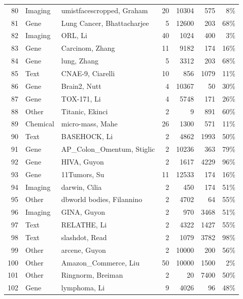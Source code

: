 \documentclass[preprint,12pt,authoryear]{elsarticle}
\begin{document}
{\begin{longtable}{@{}r p{1.9cm} p{6.7cm} r r r r@{}}
80 & Imaging & umistfacescropped, Graham \citeyearpar{graham1998characterising} & 20 & 10304 & 575 & 8\% \\
81 & Gene & Lung Cancer, Bhattacharjee \citeyearpar{bhattacharjee2001classification} & 5 & 12600 & 203 & 68\% \\
82 & Imaging & ORL, Li \citeyearpar{li2017feature} & 40 & 1024 & 400 & 3\% \\
83 & Gene & Carcinom, Zhang \citeyearpar{zhang2019unsupervised} & 11 & 9182 & 174 & 16\% \\
84 & Gene & lung, Zhang \citeyearpar{zhang2019unsupervised} & 5 & 3312 & 203 & 68\% \\
85 & Text & CNAE-9, Ciarelli \citeyearpar{cnae-9_233} & 10 & 856 & 1079 & 11\% \\
86 & Gene & Brain2, Nutt \citeyearpar{nutt2003gene} & 4 & 10367 & 50 & 30\% \\
87 & Gene & TOX-171, Li \citeyearpar{li2017feature} & 4 & 5748 & 171 & 26\% \\
88 & Other & Titanic, Ekinci \citeyearpar{ekinci2018comparative} & 2 & 9 & 891 & 60\% \\
89 & Chemical & micro-mass, Mahe \citeyearpar{mahe2014automatic} & 26 & 1300 & 571 & 11\% \\
90 & Text & BASEHOCK, Li \citeyearpar{li2017feature} & 2 & 4862 & 1993 & 50\% \\
91 & Gene & AP\_Colon\_Omentum, Stiglic \citeyearpar{stiglic2010stability} & 2 & 10236 & 363 & 79\% \\
92 & Gene & HIVA, Guyon \citeyearpar{guyon2006performance} & 2 & 1617 & 4229 & 96\% \\
93 & Gene & 11Tumors, Su \citeyearpar{su2001molecular} & 11 & 12533 & 174 & 16\% \\
94 & Imaging & darwin, Cilia \citeyearpar{cilia2018experimental} & 2 & 450 & 174 & 51\% \\
95 & Other & dbworld bodies, Filannino \citeyearpar{dbworld_e-mails_219} & 2 & 4702 & 64 & 55\% \\
96 & Imaging & GINA, Guyon \citeyearpar{guyon2006performance} & 2 & 970 & 3468 & 51\% \\
97 & Text & RELATHE, Li \citeyearpar{li2017feature} & 2 & 4322 & 1427 & 55\% \\
98 & Text & slashdot, Read \citeyearpar{read2011classifier} & 2 & 1079 & 3782 & 98\% \\
99 & Other & arcene, Guyon \citeyearpar{guyon2004result} & 2 & 10000 & 200 & 56\% \\
100 & Other & Amazon\_Commerce, Liu \citeyearpar{amazon_commerce_reviews_215} & 50 & 10000 & 1500 & 2\% \\
101 & Other & Ringnorm, Breiman \citeyearpar{breiman1996bias} & 2 & 20 & 7400 & 50\% \\
102 & Gene & lymphoma, Li \citeyearpar{li2017feature} & 9 & 4026 & 96 & 48\% \\
\end{longtable}
} %
\end{document}
